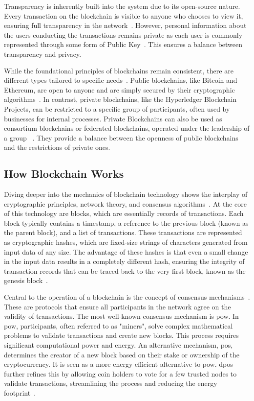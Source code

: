 Transparency is inherently built into the system due to its open-source nature. Every transaction on the blockchain is visible to anyone who chooses to view it, ensuring full transparency in the network~\cite{Banupriya.2021}. However, personal information about the users conducting the transactions remains private as each user is commonly represented through some form of Public Key~\cite{Wei.2022}. This ensures a balance between transparency and privacy.

While the foundational principles of blockchains remain consistent, there are different types tailored to specific needs~\cite{Ghosh.2021}. Public blockchains, like Bitcoin and Ethereum, are open to anyone and are simply secured by their cryptographic algorithms~\cite{Ghosh.2021}. In contrast, private blockchains, like the Hyperledger Blockchain Projects, can be restricted to a specific group of participants, often used by businesses for internal processes. Private Blockchains can also be used as consortium blockchains or federated blockchains, operated under the leadership of a group ~\cite{Lu.2023}. They provide a balance between the openness of public blockchains and the restrictions of private ones.

\subsection{How Blockchain Works}
Diving deeper into the mechanics of blockchain technology shows the interplay of cryptographic principles, network theory, and consensus algorithms~\cite{Xiong.2022}. At the core of this technology are blocks, which are essentially records of transactions. Each block typically contains a timestamp, a reference to the previous block (known as the parent block), and a list of transactions. These transactions are represented as cryptographic hashes, which are fixed-size strings of characters generated from input data of any size. The advantage of these hashes is that even a small change in the input data results in a completely different hash, ensuring the integrity of transaction records that can be traced back to the very first block, known as the genesis block~\cite{Xiong.2022}.

Central to the operation of a blockchain is the concept of consensus mechanisms~\cite{Tahir.2022}. These are protocols that ensure all participants in the network agree on the validity of transactions. The most well-known consensus mechanism is \gls{pow}. In \gls{pow}, participants, often referred to as "miners", solve complex mathematical problems to validate transactions and create new blocks. This process requires significant computational power and energy. An alternative mechanism, \gls{pos}, determines the creator of a new block based on their stake or ownership of the cryptocurrency. It is seen as a more energy-efficient alternative to \gls{pow}. \gls{dpos} further refines this by allowing coin holders to vote for a few trusted nodes to validate transactions, streamlining the process and reducing the energy footprint~\cite{KUCHKOVSKY.2021}.

